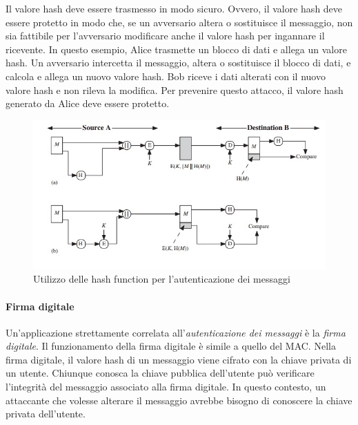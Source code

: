 \documentclass{article}
\theoremstyle{definition}
\begin{document}
Il valore hash deve essere trasmesso in modo sicuro. Ovvero, il valore hash deve essere protetto in modo che, se un avversario altera o sostituisce il messaggio, non sia fattibile per l'avversario modificare anche il valore hash per ingannare il ricevente. In questo esempio, Alice trasmette un blocco di dati e allega un valore hash. Un avversario intercetta il messaggio, altera o sostituisce il blocco di dati, e calcola e allega un nuovo valore hash. Bob riceve i dati alterati con il nuovo valore hash e non rileva la modifica. Per prevenire questo attacco, il valore hash generato da Alice deve essere protetto.

\begin{figure}[H]
    \centering
    \includegraphics[width=\textwidth]{img/alice.jpg}
    \caption{Utilizzo delle hash function per l'autenticazione dei messaggi}
    \label{fig:itm}
\end{figure}

\paragraph{Firma digitale}
Un'applicazione strettamente correlata all'\textit{autenticazione dei messaggi} è la \textit{firma digitale}. Il funzionamento della firma digitale è simile a quello del MAC. Nella firma digitale, il valore hash di un messaggio viene cifrato con la chiave privata di un utente. Chiunque conosca la chiave pubblica dell'utente può verificare l'integrità del messaggio associato alla firma digitale. In questo contesto, un attaccante che volesse alterare il messaggio avrebbe bisogno di conoscere la chiave privata dell'utente.
\end{document}
